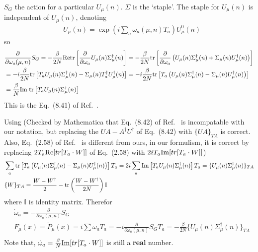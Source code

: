 $S_G$ the action for a particular $U_{\mu}(n)$. $\Sigma$ is the `staple'. The staple for $U_{\mu}(n)$ is independent of $U_{\mu}(n)$, denoting
\begin{equation}
\begin{split}
&U_{\mu}(n)=\exp \left(i \sum _a\omega _a(\mu,n) T_a\right)U_{\mu}^0(n)
\end{split}
\end{equation}
so
\begin{equation}
\begin{split}
&\frac{\partial}{\partial \omega _a (\mu,n)}S_G=-\frac{\beta}{2N}{\rm Re}{\rm tr}\left[\frac{\partial}{\partial \omega _a}U_{\mu}(n)\Sigma ^{\dagger}_{\mu}(n)\right]=-\frac{\beta}{2N}{\rm tr}\left[\frac{\partial}{\partial \omega _a}\left(U_{\mu}(n)\Sigma ^{\dagger}_{\mu}(n)+\Sigma _{\mu}(n)U^{\dagger}_{\mu}(n)\right)\right]\\
&=-i\frac{\beta}{2N}{\rm tr}\left[T_aU_{\mu}(n)\Sigma ^{\dagger}_{\mu}(n)-\Sigma _{\mu}(n)T^{\dagger}_aU^{\dagger}_{\mu}(n)\right]=-i\frac{\beta}{2N}{\rm tr}\left[T_a\left(U_{\mu}(n)\Sigma ^{\dagger}_{\mu}(n)-\Sigma _{\mu}(n)U^{\dagger}_{\mu}(n)\right)\right]\\
&=\frac{\beta}{N} {\rm Im\;tr}\left[T_aU_{\mu}(n)\Sigma ^{\dagger}_{\mu}(n)\right]\\
\end{split}
\end{equation}
This is the Eq.~(8.41) of Ref.~\cite{latticeqcdbook2010}.

Using (Checked by Mathematica that Eq.~(8.42) of Ref.~\cite{latticeqcdbook2010} is incompatable with our notation, but replacing the $UA-A^{\dagger}U^{\dagger}$ of Eq.~(8.42) with $\{UA\}_{TA}$ is correct. Also, Eq.~(2.58) of Ref.~\cite{latticeqcdbook2017} is different from ours, in our formulism, it is correct by replacing $2T_a{\rm Re}[tr[T_a\cdot W]]$ of Eq.~(2.58) with $2iT_a{\rm Im}[tr[T_a\cdot W]]$)
\begin{equation}
\begin{split}
&\sum _a {\rm tr}\left[T_a\left(U_{\mu}(n)\Sigma ^{\dagger}_{\mu}(n)-\Sigma _{\mu}(n)U^{\dagger}_{\mu}(n)\right)\right]T_a=2i\sum _a{\rm Im}\left[T_aU_{\mu}(n)\Sigma ^{\dagger}_{\mu}(n)\right]T_a=\{U_{\mu}(n)\Sigma ^{\dagger}_{\mu}(n)\}_{TA}\\
&\{W\}_{TA}=\frac{W-W^{\dagger}}{2}-{\rm tr}\left(\frac{W-W^{\dagger}}{2N}\right)\mathbb{I}\\
\end{split}
\end{equation}
where $\mathbb{I}$ is identity matrix. Therefor
\begin{equation}
\begin{split}
&\dot{\omega} _a=-\frac{\partial}{\partial \omega _a (\mu,n)}S_G\\
&F_{\mu}(x)=\dot{P}_{\mu}(x)=i\sum \dot{\omega}_a T_a=-i\frac{\partial}{\partial \omega _a (\mu,n)}S_G T_a=-\frac{\beta}{2N}\{U_{\mu}(n)\Sigma ^{\dagger}_{\mu}(n)\}_{TA}\\
\end{split}
\label{eq.hmc.force}
\end{equation}
Note that, $\dot{\omega}_a=\frac{\beta}{N}{\rm Im}[tr[T_a\cdot W]]$ is still a \textbf{real} number.

